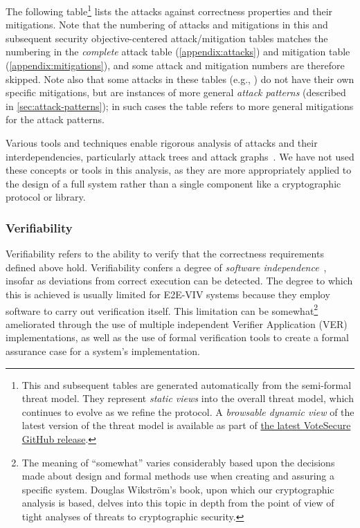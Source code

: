 \documentclass[10pt,letterpaper]{article}
\begin{document}


The following table\footnote{This and subsequent tables are generated automatically from the semi-formal threat model. They represent \emph{static views} into the overall threat model, which continues to evolve as we refine the protocol. A \emph{browsable dynamic view} of the latest version of the threat model is available as part of \href{https://github.com/FreeAndFair/VoteSecure/releases/latest}{the latest VoteSecure GitHub release}.} lists the attacks against correctness properties and their mitigations. Note that the numbering of attacks and mitigations in this and subsequent security objective-centered attack/mitigation tables matches the numbering in the \emph{complete} attack table (\autoref{appendix:attacks}) and mitigation table (\autoref{appendix:mitigations}), and some attack and mitigation numbers are therefore skipped. Note also that some attacks in these tables (e.g., \RefFullATKPrematureTabulation{}) do not have their own specific mitigations, but are instances of more general \emph{attack patterns} (described in \autoref{sec:attack-patterns}); in such cases the table refers to more general mitigations for the attack patterns.

Various tools and techniques enable rigorous analysis of attacks and their interdependencies, particularly attack trees and attack graphs~\cite{BruceSchneierAttackTrees1999,KonstaSurveyAutomaticGeneration2023,NguyenAutomatedAttack2020}. We have not used these concepts or tools in this analysis, as they are more appropriately applied to the design of a full system rather than a single component like a cryptographic protocol or library.



\subsubsection{Verifiability}

Verifiability refers to the ability to verify that the correctness requirements defined above hold. Verifiability confers a degree of \emph{software independence}~\cite{RivestVirzaSoftwareIndependence2016}, insofar as deviations from correct execution can be detected. The degree to which this is achieved is usually limited for E2E-VIV systems because they employ software to carry out verification itself. This limitation can be somewhat\footnote{The meaning of ``somewhat'' varies considerably based upon the decisions made about design and formal methods use when creating and assuring a specific system. Douglas Wikstr\"{o}m's book, upon which our cryptographic analysis is based, delves into this topic in depth from the point of view of tight analyses of threats to cryptographic security.} ameliorated through the use of multiple independent Verifier Application (VER) implementations, as well as the use of formal verification tools to create a formal assurance case for a system's implementation.
\end{document}
